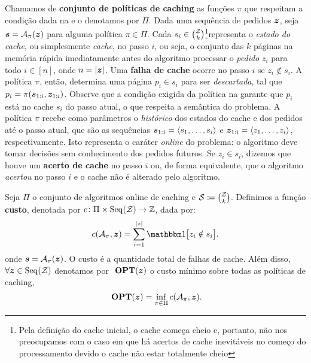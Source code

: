 Chamamos de \textbf{conjunto de políticas de caching} as funções \(\pi\) que respeitam a condição dada na  e o denotamos por \(\Pi\). Dada uma sequência de pedidos \(\bm{z}\), seja \(\bm{s} = \mathcal{A}_\pi(\bm{z})\) para alguma política \(\pi \in \Pi\). Cada \(s_i \in \binom{\mathcal{Z}}{k}\)\footnote{Pela definição do cache inicial, o cache começa cheio e, portanto, não nos preocupamos com o caso em que há acertos de cache inevitáveis no começo do processamento devido o cache não estar totalmente cheio}representa o \emph{estado do cache}, ou simplesmente \emph{cache}, no passo \(i\), ou seja, o conjunto das \(k\) páginas na memória rápida imediatamente antes do algoritmo processar o \emph{pedido} \(z_i\) para todo \(i \in [n]\), onde \(n = |\bm{z}|\). Uma \textbf{falha de cache} ocorre no passo \(i\) se \(z_i \notin s_i\). A política \(\pi\), então, determina uma página \(p_i \in s_i\) para ser \emph{descartada}, tal que \(p_i = \pi(\bm{s}_{1:i}, \bm{z}_{1:i})\). Observe que a condição exigida da política na  garante que \(p_i\) está no cache \(s_i\) do passo atual, o que respeita a semântica do problema. A política \(\pi\) recebe como parâmetros o \emph{histórico} dos estados do cache e dos pedidos até o passo atual, que são as sequências \(\bm{s}_{1:i} = \langle s_1, \dotsc, s_i\rangle\) e \(\bm{z}_{1:i} = \langle z_1, \dotsc, z_i\rangle\), respectivamente. Isto representa o caráter \emph{online} do problema: o algoritmo deve tomar decisões sem conhecimento dos pedidos futuros. Se \(z_i \in s_i\), dizemos que houve um \textbf{acerto de cache} no passo \(i\) ou, de forma equivalente, que o algoritmo \emph{acertou} no passo \(i\) e o cache não é alterado pelo algoritmo.

\begin{definition}
  Seja \(\Pi\) o conjunto de algoritmos online de caching e \(\mathcal{S} \coloneq \binom{\mathcal{Z}}{k}\). Definimos a função \textbf{custo}, denotada por \(c \colon \Pi \times \operatorname{Seq}(\mathcal{Z}) \to \mathbb{Z}\), dada por:
  \begin{equation}
    c(\Acal_\pi, \boldz) = \sum_{i=1}^{|z|} \ind{z_i \notin s_i}.
  \end{equation}
  onde \(\bm{s} = \mathcal{A}_\pi(\bm{z})\). O custo é a quantidade total de falhas de cache. Além disso, \(\forall \bm{z} \in \operatorname{Seq}(\mathcal{Z})\) denotamos por \(\ \textbf{OPT}(\bm{z})\) o custo mínimo sobre todas as políticas de caching,
  \begin{equation}
    \ \textbf{OPT}(\bm{z}) = \inf_{\pi \in \Pi} c(\mathcal{A}_\pi, \bm{z}).
  \end{equation}
\end{definition}

